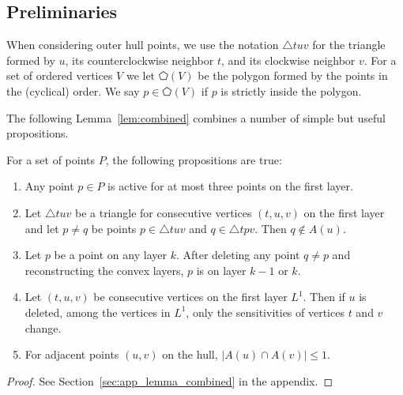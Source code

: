 \documentclass{cccg24}
\newcommand{\lrParents}[1]{\left( #1 \right)}
\newcommand{\Tri}[3]{\triangle #1#2#3}
\newcommand{\poly}[1]{\pentagon\!\lrParents{#1}}
\begin{document}
\subsection{Preliminaries}
When considering outer hull points, we use the notation $\Tri{t}{u}{v}$ for the triangle formed by $u$, its counterclockwise neighbor $t$, and its clockwise neighbor $v$. 
For a set of ordered vertices $V$ we let $\poly{V}$ be the polygon formed by the points in the (cyclical) order. We say $p \in \poly V$ if $p$ is strictly inside the polygon.

The following Lemma~\ref{lem:combined} combines a number of simple but useful propositions.

\begin{lemma}\label{lem:combined}
    For a set of points $P$, the following propositions are true:
\begin{enumerate}
    \item \label{prop:active-in-three}
    Any point $p \in P$ %
    is active for at most three points on the first layer.%
    
    \item \label{prop:no_active_points_in_active_triangle}
    Let $\Tri{t}{u}{v}$ be a triangle for consecutive vertices $(t,u,v)$ on the first layer and let $p \neq q$ be points $p \in \Tri{t}{u}{v}$ and $q \in \Tri{t}{p}{v}$. Then $q \notin A(u)$.

    \item \label{prop:monotonicity_of_layering}
    Let $p$ be a point on any layer $k$. After deleting any point $q \neq p$ and reconstructing the convex layers, $p$ is on layer $k-1$ or $k$.

    \item\label{prop:adjacent-triangles-sensitivity-change-only}
    Let $(t, u, v)$ be consecutive vertices on the first layer $L^1$. Then if $u$ is deleted, among the vertices in $L^1$, only the sensitivities of vertices $t$ and $v$ change.

    \item \label{prop:small-intersection}
    For adjacent points $(u, v)$ on the hull, $|A(u) \cap A(v)| \leq 1$.
\end{enumerate}


\end{lemma}
\begin{proof}
    See Section~\ref{sec:app_lemma_combined} in the appendix.
\end{proof}
\end{document}
